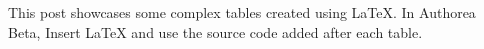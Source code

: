 This post showcases some complex tables created using LaTeX. In Authorea Beta, Insert LaTeX and use the source code added after each table.

\newline